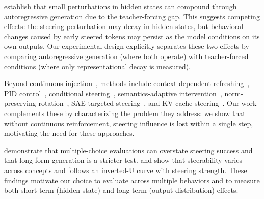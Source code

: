\citet{bachmann2024pitfalls} establish that small perturbations in hidden states
can compound through autoregressive generation due to the teacher-forcing gap.
This suggests competing effects: the steering perturbation may decay in hidden
states, but behavioral changes caused by early steered tokens may persist as
the model conditions on its own outputs.
Our experimental design explicitly separates these two effects by comparing
autoregressive generation (where both operate) with teacher-forced conditions
(where only representational decay is measured).

Beyond continuous injection~\citep{panickssery2024caa},
methods include context-dependent refreshing~\citep{li2026svf},
PID control~\citep{nguyen2025pid},
conditional steering~\citep{lee2024cast},
semantics-adaptive intervention~\citep{wang2024sadi},
norm-preserving rotation~\citep{dang2026selective},
SAE-targeted steering~\citep{chalnev2024saesteer},
and KV cache steering~\citep{kvcache2025}.
Our work complements these by characterizing the problem they address:
we show that without continuous reinforcement, steering influence is lost
within a single step, motivating the need for these approaches.

\citet{pres2024reliable} demonstrate that multiple-choice evaluations can
overstate steering success and that long-form generation is a stricter test.
\citet{tan2024steerability} and \citet{bas2025limits} show that steerability
varies across concepts and follows an inverted-U curve with steering strength.
These findings motivate our choice to evaluate across multiple behaviors and to
measure both short-term (hidden state) and long-term (output distribution)
effects.
